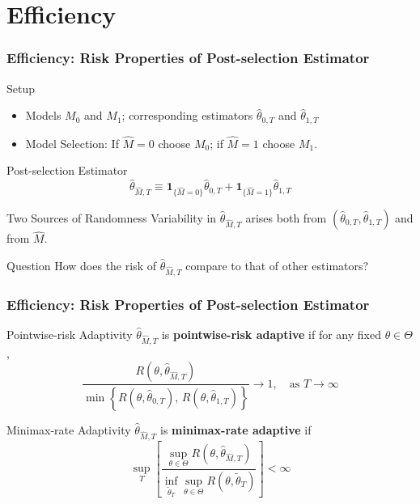 \section{Efficiency}
\begin{frame}
  \frametitle{Efficiency: Risk Properties of Post-selection Estimator}


  \begin{block}{Setup}
   \begin{itemize}
      \item Models $M_0$ and $M_1$; corresponding estimators $\widehat{\theta}_{0,T}$ and $\widehat{\theta}_{1,T}$
      \item Model Selection: If $\widehat{M} = 0$ choose $M_0$; if $\widehat{M} = 1$ choose $M_1$.
    \end{itemize}
  \end{block}

  \begin{block}{Post-selection Estimator}
    \vspace{-1.5em}
    \[\widehat{\theta}_{\widehat{M},T} \equiv \mathbf{1}_{\{ \widehat{M} = 0 \}} \widehat{\theta}_{0,T} + \mathbf{1}_{\{ \widehat{M} = 1 \}}\widehat{\theta}_{1,T}\]
  \end{block}

  \vspace{-1em}

  \begin{block}{Two Sources of Randomness}
    Variability in $\widehat{\theta}_{\widehat{M},T}$ arises both from $\left(\widehat{\theta}_{0,T}, \widehat{\theta}_{1,T} \right)$ and from $\widehat{M}$.
  \end{block}

  \begin{alertblock}{Question}
    How does the risk of $\widehat{\theta}_{\widehat{M},T}$ compare to that of other estimators?
  \end{alertblock}
  
\end{frame}
\begin{frame}
  \frametitle{Efficiency: Risk Properties of Post-selection Estimator}

  \begin{block}{Pointwise-risk Adaptivity}
    $\widehat{\theta}_{\widehat{M},T}$ is \textbf{pointwise-risk adaptive} if for any fixed $\theta \in \Theta$,
    \[
      \frac{R(\theta, \widehat{\theta}_{\widehat{M},T})}{\min\left\{ R(\theta, \widehat{\theta}_{0,T}),\, R(\theta, \widehat{\theta}_{1,T}) \right\}} \rightarrow 1, \quad \mbox{as } T\rightarrow \infty
    \]
  \end{block}

  \begin{block}{Minimax-rate Adaptivity}
    $\widehat{\theta}_{\widehat{M},T}$ is \textbf{minimax-rate adaptive} if
    \[
      \sup_{T} \left[\frac{\displaystyle\sup_{\theta\in \Theta} R(\theta, \widehat{\theta}_{\widehat{M},T})}{\displaystyle\inf_{\widetilde{\theta}_{T}}\sup_{\theta \in \Theta} R(\theta, \widetilde{\theta}_{T})}\right] < \infty
    \]
  \end{block}
\end{frame}
